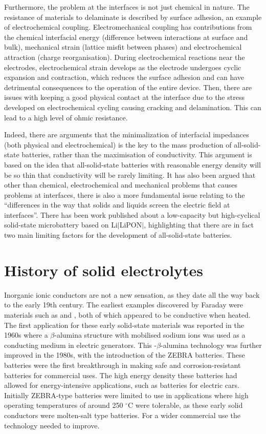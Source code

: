 \documentclass[10pt,a4paper, titlepage]{article}
\begin{document}
Furthermore, the problem at the interfaces is not just chemical in nature.
The resistance of materials to delaminate is described by surface adhesion, an example of electrochemical coupling. 
Electromechanical coupling has contributions from the chemical interfacial energy (difference between interactions at surface and bulk), mechanical strain (lattice misfit between phases) and electrochemical attraction (charge reorganisation). 
During electrochemical reactions near the electrodes, electrochemical strain develops as the electrode undergoes cyclic expansion and contraction, which reduces the surface adhesion and can have detrimental consequences to the operation of the entire device.
Then, there are issues with keeping a good physical contact at the interface due to the stress developed on electrochemical cycling causing cracking\cite{RN44} and delamination\cite{RN45}. 
This can lead to a high level of ohmic resistance.

Indeed, there are arguments that the minimalization of interfacial impedances (both physical and electrochemical) is the key to the mass production of all-solid-state batteries, rather than the maximisation of conductivity. \cite{RN47}
This argument is based on the idea that all-solid-state batteries with reasonable energy density will be so thin that conductivity will be rarely limiting. 
It has also been argued that other than chemical, electrochemical and mechanical problems that causes problems at interfaces, there is also a more fundamental issue relating to the “differences in the way that solids and liquids screen the electric field at interfaces”. 
There has been work published about a low-capacity but high-cyclical solid-state microbattery based on Li$|$LiPON$|$\cite{RN48}, highlighting that there are in fact two main limiting factors for the development of all-solid-state batteries. 

\section{History of solid electrolytes}
 
Inorganic ionic conductors are not a new sensation, as they date all the way back to the early 19th century. 
The earliest examples discovered by Faraday were materials such as  and , both of which appeared to be conductive when heated. \cite{RN11}
The first application for these early solid-state materials was reported in the 1960s where a $ \beta $-alumina structure with mobilised sodium ions was used as a conducting medium in electric generators. \cite{RN12} 
This -$\beta$-alumina technology was further improved in the 1980s, with the introduction of the ZEBRA batteries. These batteries were the first breakthrough in making safe and corrosion-resistant batteries for commercial uses. 
The high energy density these batteries had allowed for energy-intensive applications, such as batteries for electric cars. \cite{RN13}
Initially ZEBRA-type batteries were limited to use in applications where high operating temperatures of around 250 $^{\circ}$C were tolerable, as these early solid conductors were molten-salt type batteries.
For a wider commercial use the technology needed to improve.
\end{document}
